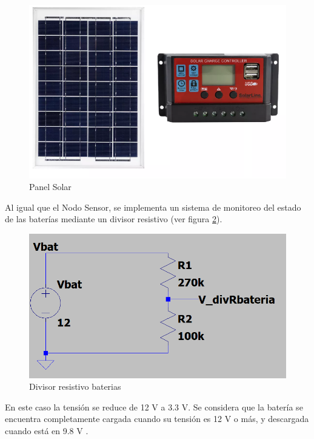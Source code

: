 \begin{figure}[H]
	\centering
	\includegraphics[scale=0.8]{./Figures/Hardware/Alimentacion/panel.png}
	\caption{Panel Solar }
	\label{fig:panel}
\end{figure}

Al igual que el Nodo Sensor, se implementa un sistema de monitoreo del estado de las baterías mediante un divisor resistivo (ver figura \ref{fig:DivresistivoBat}).

\begin{figure}[H]
	\centering
	\includegraphics[scale=0.6]{./Figures/Hardware/Alimentacion/divisor_bateria.png}
	\caption{Divisor resistivo baterias}
	\label{fig:DivresistivoBat}
\end{figure}

En este caso la tensión se reduce de 12 V a 3.3 V. Se considera que la batería se encuentra completamente cargada cuando su tensión es 12 V o más, y descargada cuando está en 9.8 V \cite{kaise}. 


